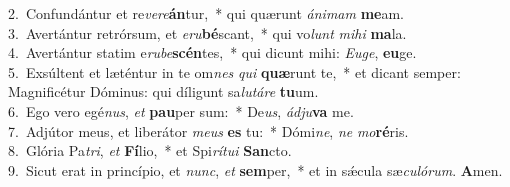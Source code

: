 {2.~}Confundántur et re\textit{ve}\textit{re}\textbf{án}tur,~* qui quærunt \textit{á}\textit{ni}\textit{mam} \textbf{me}am.\\
{3.~}Avertántur retrórsum, et \textit{e}\textit{ru}\textbf{bé}scant,~* qui vo\textit{lunt} \textit{mi}\textit{hi} \textbf{ma}la.\\
{4.~}Avertántur statim e\textit{ru}\textit{be}\textbf{scén}tes,~* qui dicunt mihi: \textit{E}\textit{u}\textit{ge}, \textbf{e}\textbf{u}ge.\\
{5.~}Exsúltent et læténtur in te om\textit{nes} \textit{qui} \textbf{quæ}runt te,~* et dicant semper: Magnificétur Dóminus: qui díligunt sa\textit{lu}\textit{tá}\textit{re} \textbf{tu}um.\\
{6.~}Ego vero egé\textit{nus}, \textit{et} \textbf{pau}per sum:~* De\textit{us}, \textit{ád}\textit{ju}\textbf{va} me.\\
{7.~}Adjútor meus, et liberátor \textit{me}\textit{us} \textbf{es} tu:~* Dómi\textit{ne}, \textit{ne} \textit{mo}\textbf{ré}ris.\\
{8.~}Glória Pa\textit{tri}, \textit{et} \textbf{Fí}lio,~* et Spi\textit{rí}\textit{tu}\textit{i} \textbf{San}cto.\\
{9.~}Sicut erat in princípio, et \textit{nunc}, \textit{et} \textbf{sem}per,~* et in sǽcula sæ\textit{cu}\textit{ló}\textit{rum}. \textbf{A}men.\\

